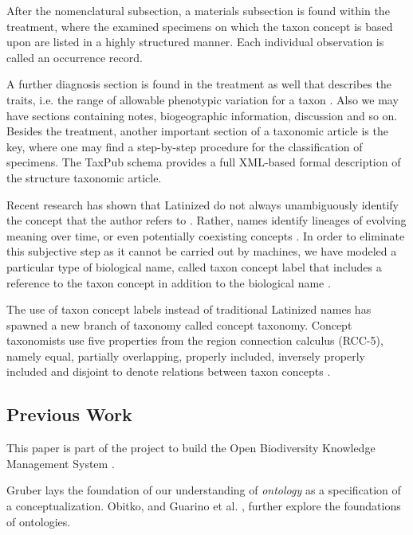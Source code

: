\documentclass{bmcart}
\begin{document}
After the nomenclatural subsection, a materials subsection is found within the treatment, where the examined specimens on which the taxon concept is based upon are listed in a highly structured manner. Each individual observation is called an occurrence record.

A further diagnosis section is found in the treatment as well that describes the traits, i.e. the range of allowable phenotypic variation for a taxon \cite{deans_time_2012}. Also we may have sections containing notes, biogeographic information, discussion and so on. Besides the treatment, another important section of a taxonomic article is the key, where one may find a step-by-step procedure for the classification of specimens. The TaxPub schema \cite{Catapano, penev_implementation_2012} provides a full XML-based formal description of the structure taxonomic article.

Recent research has shown that Latinized do not always unambiguously identify the concept that the author refers to \cite{remsen_use_2016,franz_names_2016,patterson_names_2010}. Rather, names identify lineages of evolving meaning over time, or even potentially coexisting concepts \cite{sterner_taxonomy_2017}. In order to eliminate this subjective step as it cannot be carried out by machines, we have modeled a particular type of biological name, called taxon concept label that includes a reference to the taxon concept in addition to the biological name \cite{franz_logic_2016}.

The use of taxon concept labels instead of traditional Latinized names has spawned a new branch of taxonomy called concept taxonomy. Concept taxonomists use five properties from the region connection calculus (RCC-5), namely equal, partially overlapping, properly included, inversely properly included and disjoint to denote relations between taxon concepts \cite{franz_two_2016}.

\subsection{Previous Work}

This paper is part of the project to build the Open Biodiversity Knowledge Management System \cite{Senderov2016}.

Gruber \cite{Gruber1993} lays the foundation of our understanding of \emph{ontology} as a specification of a conceptualization. Obitko, and Guarino et al. \cite{Obitko2007,Guarino2009}, further explore the foundations of ontologies.
\end{document}
